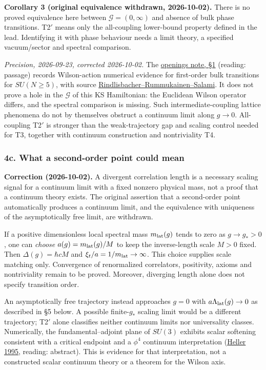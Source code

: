 \documentclass[11pt,a4paper]{article}
\begin{document}
\textbf{Corollary 3 (original equivalence withdrawn, 2026-10-02).} There
is no proved equivalence here between \(\mathcal G=(0,\infty)\) and
absence of bulk phase transitions. T2\('\) means only the all-coupling
lower-bound property defined in the lead. Identifying it with phase
behaviour needs a limit theory, a specified vacuum/sector and spectral
comparison.

\emph{Precision, 2026-09-23, corrected 2026-10-02.} The
\href{mass-gap-openings.md}{openings note, §1} (reading: passage)
records Wilson-action numerical evidence for first-order bulk
transitions for \(SU(N\ge5)\), with source
\href{https://arxiv.org/abs/2306.14319}{Rindlisbacher--Rummukainen--Salami}.
It does not prove a hole in the \(\mathcal G\) of this KS Hamiltonian:
the Euclidean Wilson operator differs, and the spectral comparison is
missing. Such intermediate-coupling lattice phenomena do not by
themselves obstruct a continuum limit along \(g\to0\). All-coupling
T2\('\) is stronger than the weak-trajectory gap and scaling control
needed for T3, together with continuum construction and nontriviality
T4.

\subsubsection{4c. What a second-order point could
mean}\label{c.-what-a-second-order-point-could-mean}

\textbf{Correction (2026-10-02).} A divergent correlation length is a
necessary scaling signal for a continuum limit with a fixed nonzero
physical mass, not a proof that a continuum theory exists. The original
assertion that a second-order point automatically produces a continuum
limit, and the equivalence with uniqueness of the asymptotically free
limit, are withdrawn.

If a positive dimensionless local spectral mass \(m_{\rm lat}(g)\) tends
to zero as \(g\to g_*>0\), one can \emph{choose}
\(a(g)=m_{\rm lat}(g)/M\) to keep the inverse-length scale \(M>0\)
fixed. Then \(\Delta(g)=\hbar cM\) and
\(\xi_t/a=1/m_{\rm lat}\to\infty\). This choice supplies scale matching
only. Convergence of renormalized correlators, positivity, axioms and
nontriviality remain to be proved. Moreover, diverging length alone does
not specify transition order.

An asymptotically free trajectory instead approaches \(g=0\) with
\(a\Lambda_{\rm lat}(g)\to0\) as described in §5 below. A possible
finite-\(g_*\) scaling limit would be a different trajectory; T2\('\)
alone classifies neither continuum limits nor universality classes.
Numerically, the fundamental--adjoint plane of \(SU(3)\) exhibits scalar
softening consistent with a critical endpoint and a \(\phi^4\) continuum
interpretation (\href{https://arxiv.org/abs/hep-lat/9508009}{Heller
1995}, reading: abstract). This is evidence for that interpretation, not
a constructed scalar continuum theory or a theorem for the Wilson axis.
\end{document}
